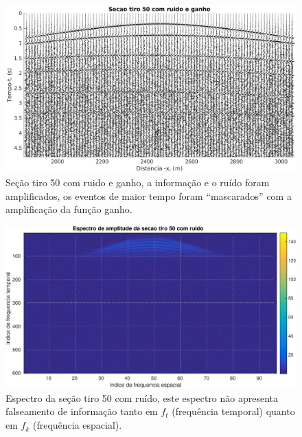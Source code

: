 \begin{landscape}
\begin{figure}[H]
\centering
\includegraphics[totalheight=14cm]{figuras/cap3/secao_tiro50_ruido_gain.eps}
\caption{Seção tiro 50 com ruido e ganho, a informação e o ruído foram amplificados, os eventos de maior tempo foram ``mascarados'' com a amplificação da função ganho.}
\label{fig:tiro_50ruido_gain}
\end{figure}
\end{landscape}

\begin{landscape}
\begin{figure}[H]
\centering
\includegraphics[totalheight=14cm]{figuras/cap3/espc_tiro50.eps}
\caption{Espectro da seção tiro 50 com ruído, este espectro não apresenta falseamento de informação tanto em $f_t$ (frequência temporal) quanto em $f_k$ (frequência espacial).}
\label{fig:espc_tiro50}
\end{figure}
\end{landscape}

